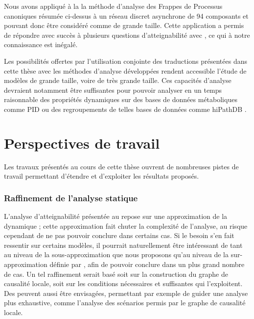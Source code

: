 Nous avons appliqué à la  la méthode d'analyse des
Frappes de Processus canoniques résumée ci-dessus
à un réseau discret asynchrone de 94 composants
et pouvant donc être considéré comme de grande taille.
Cette application a permis de répondre avec succès à plusieurs questions d'atteignabilité
avec ,
ce qui à notre connaissance est inégalé.

\myskip

Les possibilités offertes par l'utilisation conjointe des traductions présentées
dans cette thèse avec les méthodes d'analyse développées
rendent accessible l'étude de modèles de grande taille, voire de très grande taille.
Ces capacités d'analyse devraient notamment être suffisantes pour pouvoir analyser
en un temps raisonnable des propriétés dynamiques sur des bases de données métaboliques
comme PID \cite{schaefer09pid}
ou des regroupements de telles bases de données comme hiPathDB \cite{yu12hipathdb}.



\section{Perspectives de travail}

Les travaux présentés au cours de cette thèse ouvrent de nombreuses pistes de travail
permettant d'étendre et d'exploiter les résultats proposés.

% 



\subsubsection*{Raffinement de l'analyse statique}

L'analyse d'atteignabilité présentée au 
repose sur une approximation de la dynamique ;
cette approximation fait chuter la complexité de l'analyse,
au risque cependant de ne pas pouvoir conclure dans certains cas.
Si le besoin s'en fait ressentir sur certains modèles,
il pourrait naturellement être intéressant de 
tant au niveau de la sous-approximation que nous proposons qu'au niveau
de la sur-approximation définie par ,
afin de pouvoir conclure dans un plus grand nombre de cas.
Un tel raffinement serait basé soit sur la construction du graphe de causalité locale,
soit sur les conditions nécessaires et suffisantes qui l'exploitent.
Des  peuvent aussi être envisagées,
permettant par exemple de guider une analyse plus exhaustive,
comme l'analyse des scénarios permis par le graphe de causalité locale.

